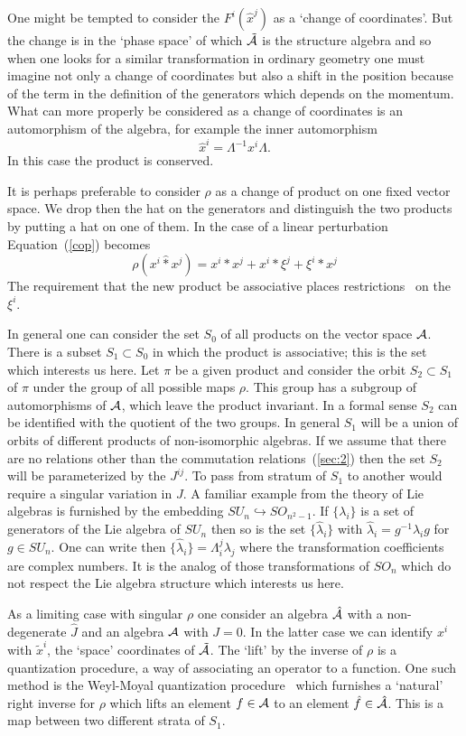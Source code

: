 \documentclass[a4paper,12pt]{article}
\def\h#1{\hat #1}
\def\t#1{\tilde #1}
\def\c#1{{\cal #1}}
\def\t#1{\tilde #1}
\def\wm{\mathbin{*}}
\def\hwm{\mathbin{\hat *}}
\begin{document}
One might be tempted to consider the $F^i(\h{x}^j)$ as a `change
of coordinates'. But the change is in the `phase space' of which
$\t{\c}{A}$ is the structure algebra and so when one looks for a
similar transformation in ordinary geometry one must imagine not only
a change of coordinates but also a shift in the position because of
the term in the definition of the generators which depends on the
momentum.  What can more properly be considered as a change of
coordinates is an automorphism of the algebra, for example the inner
automorphism
$$
\h{x}^i = \Lambda^{-1} x^i \Lambda.
$$
In this case the product is conserved. 

It is perhaps preferable to consider $\rho$ as a change of product on
one fixed vector space. We drop then the hat on the generators and
distinguish the two products by putting a hat on one of them.  In the
case of a linear perturbation Equation~(\ref{cop}) becomes
$$
\rho(x^i \hwm x^j) = x^i \wm x^j + x^i \wm \xi^j + \xi^i \wm x^j 
$$
The requirement that the new product be associative places
restrictions~\cite{Ger64} on the $\xi^i$.

In general one can consider the set $S_0$ of all products on the
vector space $\c{A}$. There is a subset $S_1 \subset S_0$ in which the
product is associative; this is the set which interests us here. Let
$\pi$ be a given product and consider the orbit $S_2 \subset S_1$ of
$\pi$ under the group of all possible maps $\rho$. This group has a
subgroup of automorphisms of $\c{A}$, which leave the product
invariant. In a formal sense $S_2$ can be identified with the quotient
of the two groups. In general $S_1$ will be a union of orbits of
different products of non-isomorphic algebras. If we assume that there
are no relations other than the commutation relations~(\ref{sec:2})
then the set $S_2$ will be parameterized by the $J^{ij}$. To pass from
stratum of $S_1$ to another would require a singular variation in $J$.
A familiar example from the theory of Lie algebras is furnished by the 
embedding $SU_n \hookrightarrow SO_{n^2-1}$. If $\{\lambda_i\}$ is a
set of generators of the Lie algebra of $SU_n$ then so is the set
$\{\h{\lambda}_i\}$ with $\h{\lambda}_i = g^{-1} \lambda_i g$ for 
$g \in SU_n$. One can write then 
$\{\h{\lambda}_i\} = \Lambda_i^j \lambda_j$ where the transformation
coefficients are complex numbers. It is the analog of those
transformations of $SO_n$ which do not respect the Lie algebra
structure which interests us here.

As a limiting case with singular $\rho$ one consider an algebra 
$\h{\c}{A}$ with a non-degenerate $\h{J}$ and an algebra $\c{A}$ with 
$J=0$. In the latter case we can
identify $x^i$ with $\t{x}^i$, the `space' coordinates of 
$\t{\c}{A}$. The `lift' by the inverse of $\rho$ is a
quantization procedure, a way of associating an operator to a
function.  One such method is the Weyl-Moyal quantization
procedure~\cite{Wey50,Moy49} which furnishes a `natural' right inverse 
for $\rho$ which lifts an element $f \in \c{A}$ to an element 
$\h{f} \in \h{\c}{A}$. This is a map between two different strata of
$S_1$.
\end{document}
